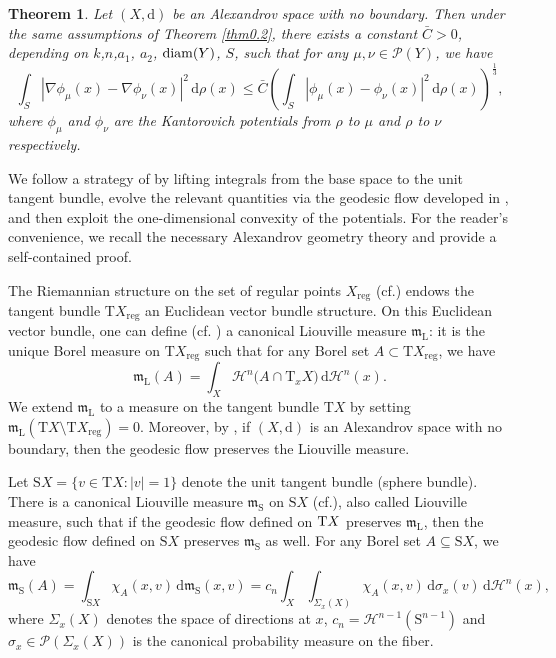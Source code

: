 \documentclass[a4paper,11pt]{article}
\numberwithin{equation}{section}
\theoremstyle{plain}
\newtheorem{theorem}{Theorem}[section]
\theoremstyle{definition}
\theoremstyle{remark}
\newcommand{\mm}{\mathfrak m}
\newcommand{\diam}{\mathop{\rm diam}\nolimits}
\renewcommand{\d}{{\mathrm d}}
\begin{document}
	\begin{theorem}\label{thm2}
			Let $(X,  \d)$ be an Alexandrov space with no boundary. Then under the same assumptions of Theorem \ref{thm0.2},  there exists a constant $\bar{C}>0$, depending on $k$,$n$,$a_1$, $a_2$, $\diam(Y)$,  $S$, such that for any $\mu,\nu\in\mathcal{P}(Y)$, we have 
		\begin{equation}
			\int_S |\nabla\phi_\mu(x)-\nabla\phi_\nu(x)|^2\,\d\rho(x)\leq \bar{C} \left(\int_S|\phi_\mu(x)-\phi_\nu(x)|^2\,\d\rho(x)\right)^\frac{1}{3},
		\end{equation}
		where $\phi_\mu$ and $\phi_\nu$ are the Kantorovich potentials from $\rho$ to $\mu$ and $\rho$ to $\nu$ respectively.
	\end{theorem}
	
 We follow a strategy of \cite{arXiv:2504.05412} by lifting integrals from the base space to the unit tangent bundle,  evolve the relevant quantities via the geodesic flow developed in \cite{zbMATH07328107},  and then exploit the one-dimensional convexity of the potentials.  For the reader's convenience, we recall the necessary Alexandrov geometry theory and provide a self-contained proof.
	
	The Riemannian structure on the set of regular points $X_{\mathrm{reg}}$ (cf.\cite{zbMATH00606998}) endows  the tangent bundle $\mathrm{T}X_{\mathrm{reg}}$ an  Euclidean vector bundle structure.  On this Euclidean vector bundle, one can define (cf. \cite[Section3]{zbMATH07328107} ) a canonical Liouville measure $\mm_\mathrm L$: it is the unique Borel measure on $\mathrm{T}X_{\mathrm{reg}}$ such that for any Borel set $A\subset \mathrm{T}X_{\mathrm{reg}}$, we have
	\begin{equation*}
		\mm_\mathrm L(A)=\int_X \mathcal{H}^n\big(A\cap \mathrm{T}_xX\big)\,\d\mathcal{H}^n(x).
	\end{equation*}
	We extend $\mm_\mathrm L$ to a measure on the tangent bundle $\mathrm{T}X$ by setting $\mm_\mathrm L(\mathrm{T}X\setminus\mathrm{T}X_{\mathrm{reg}})=0$.   Moreover, by  \cite[Theorem 1.4]{zbMATH07694914}, if $(X,  \d)$ is an Alexandrov space with no boundary, then the geodesic flow preserves the Liouville measure. 
	
	Let $\mathrm{S}X=\{v\in \mathrm{T}X: |v|=1\}$ denote the unit tangent bundle (sphere bundle). There is a canonical Liouville measure $\mm_\mathrm S$ on $\mathrm{S}X$ (cf.\cite[Section 3.6]{zbMATH07328107}), also called Liouville measure, such that if the geodesic flow defined on ${\rm T}X$ preserves $\mm_\mathrm L$, then the geodesic flow defined on ${\mathrm S}X$ preserves $\mm_\mathrm S$ as well.   For any Borel set $A\subseteq {\mathrm S}X$, we have
	\begin{equation}\label{liouville}
		\mm_\mathrm S(A)=\int_{{\mathrm S}X}\chi_A(x,v)\,\d\mm_\mathrm S(x,v)=c_n\int_X\int_{\Sigma_x(X)} \chi_A(x,v)\,\d\sigma_x(v)\,\d\mathcal{H}^n(x),
	\end{equation}
	where $\Sigma_x(X)$ denotes the space of directions at $x$, $c_n=\mathcal{H}^{n-1}({\mathrm S}^{n-1})$ and $\sigma_x\in \mathcal{P}(\Sigma_x(X))$ is the canonical probability measure on the fiber.
	
\end{document}
